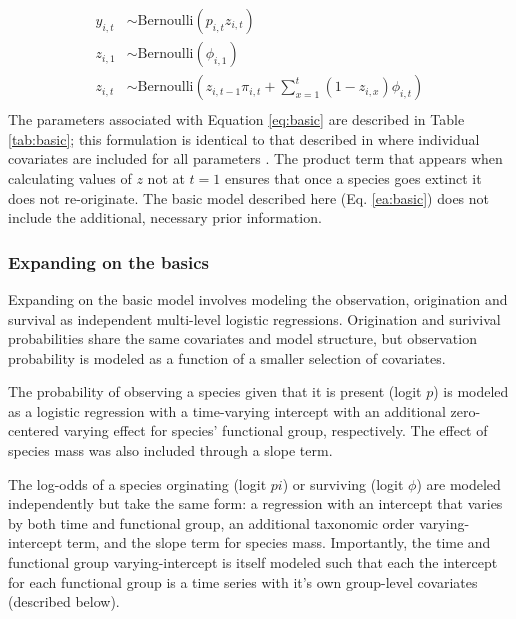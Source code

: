 \documentclass[12pt,letterpaper]{article}
\begin{document}
\begin{equation}
  \begin{aligned}
    y_{i, t} &\sim \text{Bernoulli}(p_{i, t} z_{i, t}) \\
    z_{i, 1} &\sim \text{Bernoulli}(\phi_{i, 1}) \\
    z_{i, t} &\sim \text{Bernoulli}\left(z_{i, t - 1} \pi_{i,t} + \sum_{x = 1}^{t}(1 - z_{i, x}) \phi_{i,t}\right) \\
  \end{aligned}
  \label{eq:basic}
\end{equation}
The parameters associated with Equation \ref{eq:basic} are described in Table \ref{tab:basic}; this formulation is identical to that described in where individual covariates are included for all parameters \citep{Royle2008}. The product term that appears when calculating values of \(z\) not at \(t = 1\) ensures that once a species goes extinct it does not re-originate. The basic model described here (Eq. \ref{ea:basic}) does not include the additional, necessary prior information. 


\subsubsection*{Expanding on the basics}
Expanding on the basic model involves modeling the observation, origination and survival as independent multi-level logistic regressions. Origination and surivival probabilities share the same covariates and model structure, but observation probability is modeled as a function of a smaller selection of covariates.

The probability of observing a species given that it is present (logit \(p\)) is modeled as a logistic regression with a time-varying intercept with an additional zero-centered varying effect for species' functional group, respectively. The effect of species mass was also included through a slope term.

The log-odds of a species orginating (logit \(pi\)) or surviving (logit \(\phi\)) are modeled independently but take the same form: a regression with an intercept that varies by both time and functional group, an additional taxonomic order varying-intercept term, and the slope term for species mass. Importantly, the time and functional group varying-intercept is itself modeled such that each the intercept for each functional group is a time series with it's own group-level covariates (described below). 
\end{document}
